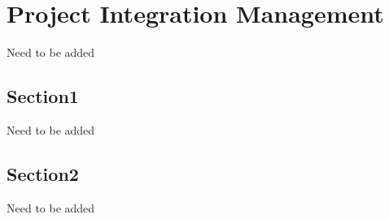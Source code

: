 \chapter{Project Integration Management}
Need to be added
\section{Section1}
Need to be added
\section{Section2}
Need to be added